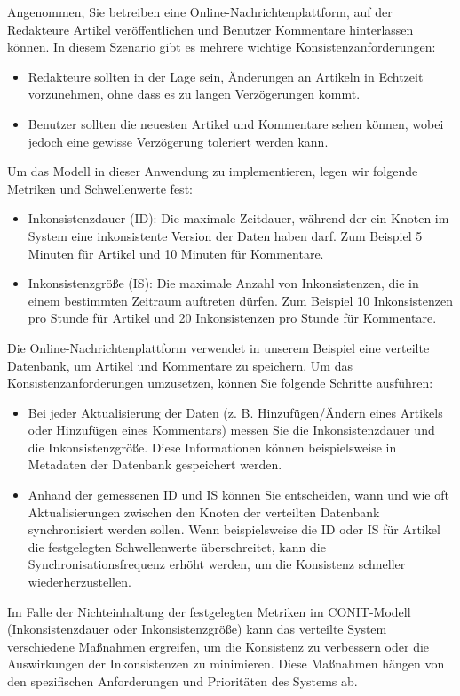 \documentclass[../vs-script-first-v01.tex]{subfiles}
\begin{document}
Angenommen, Sie betreiben eine Online-Nachrichtenplattform, auf der Redakteure Artikel veröffentlichen und Benutzer Kommentare hinterlassen können. In diesem Szenario gibt es mehrere wichtige Konsistenzanforderungen:
\begin{itemize}
\item Redakteure sollten in der Lage sein, Änderungen an Artikeln in Echtzeit vorzunehmen, ohne dass es zu langen Verzögerungen kommt.
\item Benutzer sollten die neuesten Artikel und Kommentare sehen können, wobei jedoch eine gewisse Verzögerung toleriert werden kann.
\end{itemize}
Um das Modell in dieser Anwendung zu implementieren, legen wir folgende Metriken und Schwellenwerte fest:
\begin{itemize}
\item Inkonsistenzdauer (ID): Die maximale Zeitdauer, während der ein Knoten im System eine inkonsistente Version der Daten haben darf. Zum Beispiel 5 Minuten für Artikel und 10 Minuten für Kommentare.
\item Inkonsistenzgröße (IS): Die maximale Anzahl von Inkonsistenzen, die in einem bestimmten Zeitraum auftreten dürfen. Zum Beispiel 10 Inkonsistenzen pro Stunde für Artikel und 20 Inkonsistenzen pro Stunde für Kommentare.
\end{itemize}

Die Online-Nachrichtenplattform verwendet in unserem Beispiel eine verteilte Datenbank, um Artikel und Kommentare zu speichern. Um das Konsistenzanforderungen umzusetzen, können Sie folgende Schritte ausführen:
\begin{itemize}
\item Bei jeder Aktualisierung der Daten (z. B. Hinzufügen/Ändern eines Artikels oder Hinzufügen eines Kommentars) messen Sie die Inkonsistenzdauer und die Inkonsistenzgröße. Diese Informationen können beispielsweise in Metadaten der Datenbank gespeichert werden.
\item Anhand der gemessenen ID und IS können Sie entscheiden, wann und wie oft Aktualisierungen zwischen den Knoten der verteilten Datenbank synchronisiert werden sollen. Wenn beispielsweise die ID oder IS für Artikel die festgelegten Schwellenwerte überschreitet, kann die Synchronisationsfrequenz erhöht werden, um die Konsistenz schneller wiederherzustellen.
\end{itemize}

Im Falle der Nichteinhaltung der festgelegten Metriken im CONIT-Modell (Inkonsistenzdauer oder Inkonsistenzgröße) kann das verteilte System verschiedene Maßnahmen ergreifen, um die Konsistenz zu verbessern oder die Auswirkungen der Inkonsistenzen zu minimieren. Diese Maßnahmen hängen von den spezifischen Anforderungen und Prioritäten des Systems ab.
\end{document}
